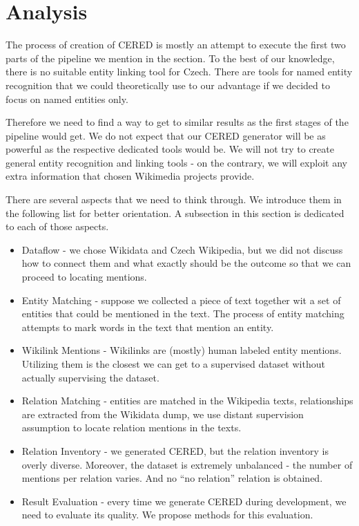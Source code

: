 \section{Analysis}
\label{sec:analysis}
The process of creation of CERED is mostly an attempt to execute the first two parts of the pipeline we mention in the 
 section. To the best of our knowledge, there is no suitable entity linking tool for Czech. There are tools for named entity recognition that we could theoretically use to our advantage if we decided to focus on named entities only.

Therefore we need to find a way to get to similar results as the first stages of the pipeline would get. We do not expect that our CERED generator will be as powerful as the respective dedicated tools would be. We will not try to create general entity recognition and linking tools - on the contrary, we will exploit any extra information that chosen Wikimedia projects provide.

There are several aspects that we need to think through. We introduce them in the following list for better orientation. A subsection in this section is dedicated to each of those aspects. 
\begin{itemize}
 \item  Dataflow - we chose Wikidata and Czech Wikipedia, but we did not discuss how to connect them and what exactly should be the outcome so that we can proceed to locating mentions.
 \item  Entity Matching - suppose we collected a piece of text together wit a set of entities that could be mentioned in the text. The process of entity matching attempts to mark words in the text that mention an entity.
 \item  Wikilink Mentions - Wikilinks are (mostly) human labeled entity mentions. Utilizing them is the closest we can get to a supervised dataset without actually supervising the dataset.
 \item  Relation Matching - entities are matched in the Wikipedia texts, relationships are extracted from the Wikidata dump, we use distant supervision assumption to locate relation mentions in the texts.
\item Relation Inventory - we generated CERED, but the relation inventory is overly diverse. Moreover, the dataset is extremely unbalanced - the number of mentions per relation varies. And no “no relation” relation is obtained.
 \item  Result Evaluation - every time we generate CERED during development, we need to evaluate its quality. We propose methods for this evaluation. 
\end{itemize}




